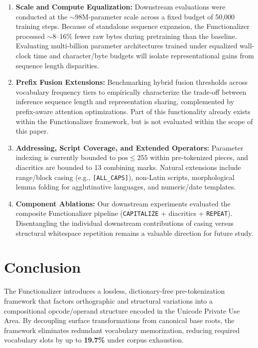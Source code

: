 \documentclass{article}
\begin{document}
\begin{enumerate}
    \item \textbf{Scale and Compute Equalization:} Downstream evaluations were conducted at the $\sim$98M-parameter scale across a fixed budget of 50,000 training steps. Because of standalone sequence expansion, the Functionalizer processed $\sim$8--16\% fewer raw bytes during pretraining than the baseline. Evaluating multi-billion parameter architectures trained under equalized wall-clock time and character/byte budgets will isolate representational gains from sequence length disparities.
    \item \textbf{Prefix Fusion Extensions:} Benchmarking hybrid fusion thresholds across vocabulary frequency tiers to empirically characterize the trade-off between inference sequence length and representation sharing, complemented by prefix-aware attention optimizations. Part of this functionality already exists within the Functionalizer framework, but is not evaluated within the scope of this paper.
    \item \textbf{Addressing, Script Coverage, and Extended Operators:} Parameter indexing is currently bounded to $\text{pos} \le 255$ within pre-tokenized pieces, and diacritics are bounded to 13 combining marks. Natural extensions include range/block casing (e.g., \texttt{[ALL\_CAPS]}), non-Latin scripts, morphological lemma folding for agglutinative languages, and numeric/date templates.
    \item \textbf{Component Ablations:} Our downstream experiments evaluated the composite Functionalizer pipeline (\texttt{CAPITALIZE} + diacritics + \texttt{REPEAT}). Disentangling the individual downstream contributions of casing versus structural whitespace repetition remains a valuable direction for future study.
\end{enumerate}

\section{Conclusion}

The Functionalizer introduces a lossless, dictionary-free pre-tokenization framework that factors orthographic and structural variations into a compositional opcode/operand structure encoded in the Unicode Private Use Area. By decoupling surface transformations from canonical base roots, the framework eliminates redundant vocabulary memorization, reducing required vocabulary slots by up to \textbf{19.7\%} under corpus exhaustion.
\end{document}
